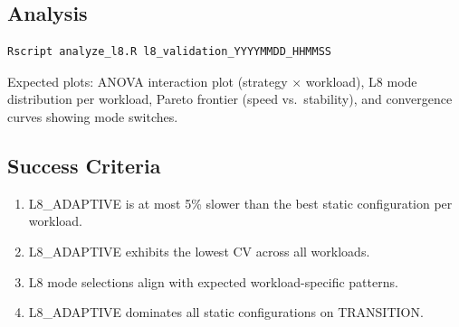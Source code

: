 \subsection{Analysis}

\begin{lstlisting}[language=bash]
Rscript analyze_l8.R l8_validation_YYYYMMDD_HHMMSS
\end{lstlisting}

Expected plots: ANOVA interaction plot (strategy $\times$ workload), L8 mode
distribution per workload, Pareto frontier (speed vs.\ stability), and
convergence curves showing mode switches.

\subsection{Success Criteria}

\begin{enumerate}
  \item L8\_ADAPTIVE is at most 5\% slower than the best static
        configuration per workload.
  \item L8\_ADAPTIVE exhibits the lowest CV across all workloads.
  \item L8 mode selections align with expected workload-specific patterns.
  \item L8\_ADAPTIVE dominates all static configurations on TRANSITION.
\end{enumerate}
